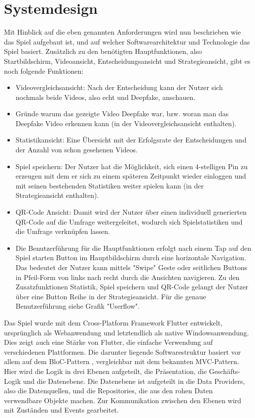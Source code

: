 \section{Systemdesign}
Mit Hinblick auf die eben genannten Anforderungen wird nun beschrieben wie das Spiel aufgebaut ist, 
und auf welcher Softwarearchitektur und Technologie das Spiel basiert.
Zusätzlich zu den benötigten Hauptfunktionen, also Startbildschirm, Videoansicht, Entscheidungsansicht und Strategieansicht, gibt es noch folgende Funktionen:
\begin{itemize}
    \item Videovergleichsansicht: Nach der Entscheidung kann der Nutzer sich nochmals beide Videos, also echt und Deepfake, anschauen.
    \item Gründe warum das gezeigte Video Deepfake war, bzw. woran man das Deepfake Video erkennen kann (in der Videovergleichsansicht enthalten).
    \item Statistikansicht: Eine Übersicht mit der Erfolgsrate der Entscheidungen und der Anzahl von schon gesehenen Videos.
    \item Spiel speichern: Der Nutzer hat die Möglichkeit, sich einen 4-stelligen Pin zu erzeugen mit dem er sich zu einem späteren Zeitpunkt wieder einloggen
         und mit seinen bestehenden Statistiken weiter spielen kann (in der Strategieansicht enthalten).
    \item QR-Code Ansicht: Damit wird der Nutzer über einen individuell generierten QR-Code auf die Umfrage weitergeleitet, wodurch sich Spielstatistiken und die Umfrage verknüpfen lassen.
    \item Die Benutzerführung für die Hauptfunktionen erfolgt nach einem Tap auf den Spiel starten Button im Hauptbildschirm durch eine horizontale Navigation. 
        Das bedeutet der Nutzer kann mittels "Swipe" Geste oder seitlichen Buttons in Pfeil-Form von links nach recht durch die Ansichten navigieren. 
        Zu den Zusatzfunktionen Statistik, Spiel speichern und QR-Code gelangt der Nutzer über eine Button Reihe in der Strategieansicht. Für die genaue Benutzerführung siehe Grafik "Userflow".
\end{itemize}
Das Spiel wurde mit dem Cross-Platform Framework Flutter entwickelt, ursprünglich als Webanwendung und letztendlich als native Windowsanwendung. 
Dies zeigt auch eine Stärke von Flutter, die einfache Verwendung auf verschiedenen Plattformen.
Die darunter liegende Softwarestruktur basiert vor allem auf dem BloC-Pattern \cite{BlocStateManagement}, vergleichbar mit dem bekannten MVC-Pattern. 
Hier wird die Logik in drei Ebenen aufgeteilt, die Präsentation, die Geschäfts-Logik und die Datenebene. 
Die Datenebene ist aufgeteilt in die Data Providers, also die Datenquellen, und die Repositories, die aus den rohen Daten verwendbare Objekte machen. \cite{Architecture}
Zur Kommunikation zwischen den Ebenen wird mit Zuständen und Events gearbeitet.
